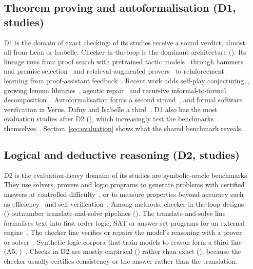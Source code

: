 \subsection{Theorem proving and autoformalisation (D1,  studies)}
D1 is the domain of exact checking:  of its  studies receive a sound verdict, almost all from Lean or Isabelle. Checker-in-the-loop is the dominant architecture (). Its lineage runs from proof search with pretrained tactic models~\cite{han2022proof,lample2022hypertree,polu2023formal} through hammers and premise selection~\cite{jiang2022thor,mikua2024magnushammer} and retrieval-augmented provers~\cite{yang2023leandojo} to reinforcement learning from proof-assistant feedback~\cite{xin2025deepseek,lin2026goedel,xin2026scaling}. Recent work adds self-play conjecturing~\cite{dong2025stp,wilf2026propose}, growing lemma libraries~\cite{wang2024lego}, agentic repair~\cite{requena2026minimal,ospanov2025apollo} and recursive informal-to-formal decomposition~\cite{jiang2023draft,varambally2026hilbert}. Autoformalisation forms a second strand~\cite{wu2022autoformalization,li2024autoformalize,chen2026reform,cabral2026proofflow}, and formal software verification in Verus, Dafny and Isabelle a third~\cite{lin2024fvel,aggarwal2025alphaverus,yang2026exverus,chen2025automated}. D1 also has the most evaluation studies after D2 (), which increasingly test the benchmarks themselves~\cite{ospanov2025minif2f,ammanamanchi2026faults,poiroux2025reliable}. Section~\ref{sec:evaluation} shows what the shared benchmark reveals.

\subsection{Logical and deductive reasoning (D2,  studies)}
D2 is the evaluation-heavy domain:  of its studies are symbolic-oracle benchmarks. They use solvers, provers and logic programs to generate problems with certified answers at controlled difficulty~\cite{saparov2023language,lin2025zebralogic,qi2025large,wei2025satbench,xu2026socrates}, or to measure properties beyond accuracy such as efficiency~\cite{opedal2025language} and self-verification~\cite{stechly2025self}. Among methods, checker-in-the-loop designs () outnumber translate-and-solve pipelines (). The translate-and-solve line formalises text into first-order logic, SAT or answer-set programs for an external engine~\cite{olausson2023linc,ye2023satlm,alviano2025integrating,jurayj2026language}. The checker line verifies or repairs the model's reasoning with a prover or solver~\cite{quan2024verification,ryu2025divide,feng2026vericot,schrader2026solver}. Synthetic logic corpora that train models to reason form a third line (A5, )~\cite{clark2020transformers,morishita2024enhancing,wang2025logictree}. Checks in D2 are mostly empirical () rather than exact (), because the checker usually certifies consistency or the answer rather than the translation.

